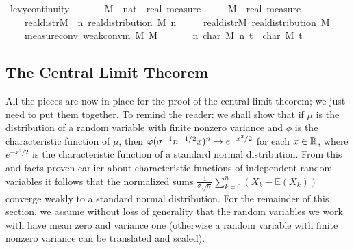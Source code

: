 \documentclass[leqno]{article}
\theoremstyle{definition}
\renewcommand{\E}{\mathbb E}
\begin{document}
\begin{isabellebody}
\isamarkupfalse%
\ levy{\isacharunderscore}continuity{}{\isacharcolon}\isanewline
\ \ \isanewline
\ \ \ \ M\ {\isacharcolon}{\isacharcolon}\ {\isachardoublequoteopen}nat\ {\isasymRightarrow}\ real\ measure{\isachardoublequoteclose}\ \isanewline
\ \ \ \ M{\isacharprime}\ {\isacharcolon}{\isacharcolon}\ {\isachardoublequoteopen}real\ measure{\isachardoublequoteclose}\isanewline
\ \ \ \isanewline
\ \ \ \ real{\isacharunderscore}distr{\isacharunderscore}M\ {\isacharcolon}\ {\isachardoublequoteopen}{\isasymAnd}n{\isachardot}\ real{\isacharunderscore}distribution\ {\isacharparenleft}M\ n{\isacharparenright}{\isachardoublequoteclose}\ \isanewline
\ \ \ \ real{\isacharunderscore}distr{\isacharunderscore}M{\isacharprime}{\isacharcolon}\ {\isachardoublequoteopen}real{\isacharunderscore}distribution\ M{\isacharprime}{\isachardoublequoteclose}\ \isanewline
\ \ \ \ measure{\isacharunderscore}conv{\isacharcolon}\ {\isachardoublequoteopen}weak{\isacharunderscore}conv{\isacharunderscore}m\ M\ M{\isacharprime}{\isachardoublequoteclose}\isanewline
\ \ \isanewline
\ \ \ \ {\isachardoublequoteopen}{\isacharparenleft}{\isasymlambda}n{\isachardot}\ char\ {\isacharparenleft}M\ n{\isacharparenright}\ t{\isacharparenright}\ {\isacharminus}{\isacharminus}{\isacharminus}{\isacharminus}{\isachargreater}\ char\ M{\isacharprime}\ t{\isachardoublequoteclose}
\end{isabellebody}

\subsection{The Central Limit Theorem}

All the pieces are now in place for the proof of the central limit theorem; we just need to put them together. To remind the reader: we shall show that if $\mu$ is the distribution of a random variable with finite nonzero variance and $\phi$ is the characteristic function of $\mu$, then $\varphi(\sigma^{-1} n^{-1/2} x)^n \rightarrow e^{-x^2/2}$ for each $x \in \mathbb{R}$, where $e^{-x^2/2}$ is the characteristic function of a standard normal distribution. From this and facts proven earlier about characteristic functions of independent random variables it follows that the normalized sums $\frac{1}{\sigma \sqrt n} \sum_{k=0}^n (X_k - \E(X_k))$ converge weakly to a standard normal distribution. For the remainder of this section, we assume without loss of generality that the random variables we work with have mean zero and variance one (otherwise a random variable with finite nonzero variance can be translated and scaled).
\end{document}

